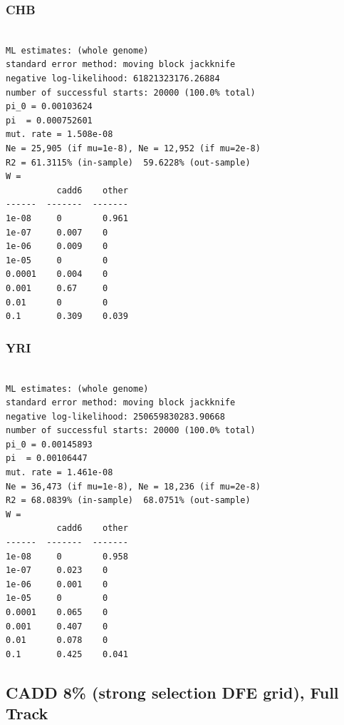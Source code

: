 \documentclass[11pt]{article}
\begin{document}
\subsubsection*{CHB}
\begin{minipage}{\linewidth}\begin{footnotesize}
\begin{verbatim}

ML estimates: (whole genome)
standard error method: moving block jackknife
negative log-likelihood: 61821323176.26884
number of successful starts: 20000 (100.0% total)
pi_0 = 0.00103624
pi  = 0.000752601
mut. rate = 1.508e-08 
Ne = 25,905 (if mu=1e-8), Ne = 12,952 (if mu=2e-8)
R2 = 61.3115% (in-sample)  59.6228% (out-sample)
W = 
          cadd6    other
------  -------  -------
1e-08     0        0.961
1e-07     0.007    0
1e-06     0.009    0
1e-05     0        0
0.0001    0.004    0
0.001     0.67     0
0.01      0        0
0.1       0.309    0.039
\end{verbatim}
\end{footnotesize}\end{minipage}


\subsubsection*{YRI}
\begin{minipage}{\linewidth}\begin{footnotesize}
\begin{verbatim}

ML estimates: (whole genome)
standard error method: moving block jackknife
negative log-likelihood: 250659830283.90668
number of successful starts: 20000 (100.0% total)
pi_0 = 0.00145893
pi  = 0.00106447
mut. rate = 1.461e-08 
Ne = 36,473 (if mu=1e-8), Ne = 18,236 (if mu=2e-8)
R2 = 68.0839% (in-sample)  68.0751% (out-sample)
W = 
          cadd6    other
------  -------  -------
1e-08     0        0.958
1e-07     0.023    0
1e-06     0.001    0
1e-05     0        0
0.0001    0.065    0
0.001     0.407    0
0.01      0.078    0
0.1       0.425    0.041
\end{verbatim}
\end{footnotesize}\end{minipage}


\subsection{CADD 8\% (strong selection DFE grid), Full Track}
\end{document}
